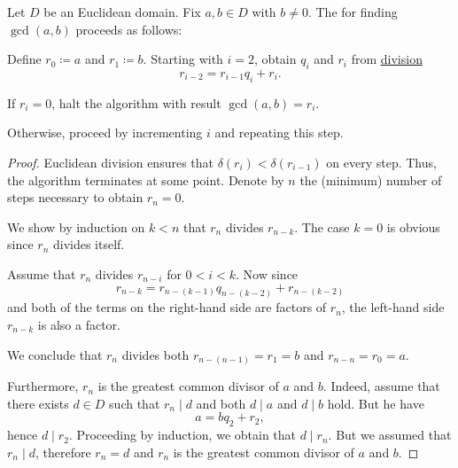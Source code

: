 \begin{algorithm}\label{alg:euclidean_algorithm}
  Let \( D \) be an Euclidean domain. Fix \( a, b \in D \) with \( b \neq 0 \). The  for finding \( \gcd(a, b) \) proceeds as follows:
  \begin{thmenum}
     Define \( r_0 \coloneqq a \) and \( r_1 \coloneqq b \).
     Starting with \( i = 2 \), obtain \( q_i \) and \( r_i \) from \hyperref[def:euclidean_domain]{division}
    \begin{equation*}
      r_{i-2} = r_{i-1} q_i + r_i.
    \end{equation*}

    If \( r_i = 0 \), halt the algorithm with result \( \gcd(a, b) = r_i \).

    Otherwise, proceed by incrementing \( i \) and repeating this step.
  \end{thmenum}
\end{algorithm}
\begin{proof}
  Euclidean division ensures that \( \delta(r_i) < \delta(r_{i-1}) \) on every step. Thus, the algorithm terminates at some point. Denote by \( n \) the (minimum) number of steps necessary to obtain \( r_n = 0 \).

  We show by induction on \( k < n \) that \( r_n \) divides \( r_{n-k} \). The case \( k = 0 \) is obvious since \( r_n \) divides itself.

  Assume that \( r_n \) divides \( r_{n-i} \) for \( 0 < i < k \). Now since
  \begin{equation*}
    r_{n-k} = r_{n-(k-1)} q_{n-(k-2)} + r_{n-(k-2)}
  \end{equation*}
  and both of the terms on the right-hand side are factors of \( r_n \), the left-hand side \( r_{n-k} \) is also a factor.

  We conclude that \( r_n \) divides both \( r_{n-(n-1)} = r_1 = b \) and \( r_{n-n} = r_0 = a \).

  Furthermore, \( r_n \) is the greatest common divisor of \( a \) and \( b \). Indeed, assume that there exists \( d \in D \) such that \( r_n \mid d \) and both \( d \mid a \) and \( d \mid b \) hold. But he have
  \begin{equation*}
    a = b q_2 + r_2,
  \end{equation*}
  hence \( d \mid r_2 \). Proceeding by induction, we obtain that \( d \mid r_n \). But we assumed that \( r_n \mid d \), therefore \( r_n = d \) and \( r_n \) is the greatest common divisor of \( a \) and \( b \).
\end{proof}

